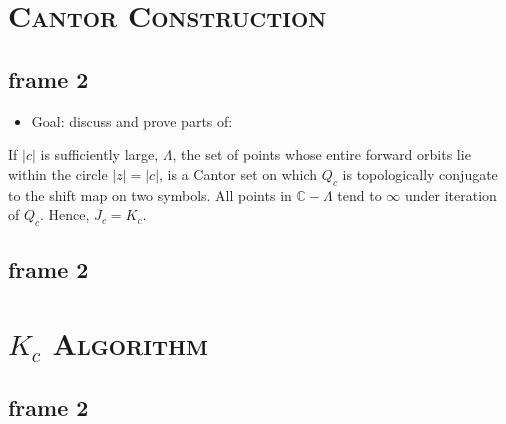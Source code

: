 \documentclass[xcolor=x11names,compress]{beamer}
\renewcommand{\(}{\begin{columns}}
\renewcommand{\)}{\end{columns}}
\newcommand{\<}[1]{\begin{column}{#1}}
\renewcommand{\>}{\end{column}}
\begin{document}
\section{\scshape Cantor Construction}


\subsection{frame 2}
\begin{frame}

\begin{itemize}
\item Goal: discuss and prove parts of:
\end{itemize}

\vspace{1cm}

\begin{theorem}
If $|c|$ is sufficiently large, $\Lambda$, the set of points whose entire forward orbits lie within the circle $|z|=|c|$, is a Cantor set on which $Q_c$ is topologically conjugate to the shift map on two symbols. All points in $\mathbb{C} - \Lambda$ tend to $\infty$ under iteration of $Q_c$. Hence, $J_c=K_c$.
\end{theorem}

\end{frame}


\subsection{frame 2}
\begin{frame}

\end{frame}


\section{\scshape $K_c$ Algorithm}
\subsection{frame 2}
\begin{frame}

\end{frame}

\end{document}

